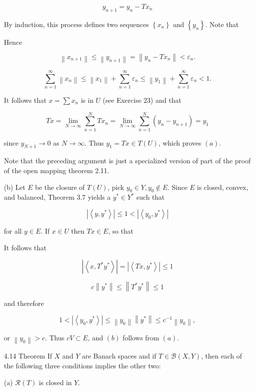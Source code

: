 \documentclass[10pt]{article}
\begin{document}
$$
y_{n+1}=y_{n}-T x_{n}
$$

By induction, this process defines two sequences $\left\{x_{n}\right\}$ and $\left\{y_{n}\right\}$. Note that

Hence

$$
\left\|x_{n+1}\right\| \leq\left\|y_{n+1}\right\|=\left\|y_{n}-T x_{n}\right\|<\varepsilon_{n} .
$$

$$
\sum_{n=1}^{\infty}\left\|x_{n}\right\| \leq\left\|x_{1}\right\|+\sum_{n=1}^{\infty} \varepsilon_{n} \leq\left\|y_{1}\right\|+\sum_{n=1}^{\infty} \varepsilon_{n}<1 .
$$

It follows that $x=\sum x_{n}$ is in $U$ (see Exercise 23) and that

$$
T x=\lim _{N \rightarrow \infty} \sum_{n=1}^{N} T x_{n}=\lim _{N \rightarrow \infty} \sum_{n=1}^{N}\left(y_{n}-y_{n+1}\right)=y_{1}
$$

since $y_{N+1} \rightarrow 0$ as $N \rightarrow \infty$. Thus $y_{1}=T x \in T(U)$, which proves $(a)$.

Note that the preceding argument is just a specialized version of part of the proof of the open mapping theorem 2.11.

(b) Let $E$ be the closure of $T(U)$, pick $y_{0} \in Y, y_{0} \notin E$. Since $E$ is closed, convex, and balanced, Theorem 3.7 yields a $y^{*} \in Y^{*}$ such that

$$
\left|\left\langle y, y^{*}\right\rangle\right| \leq 1<\left|\left\langle y_{0}, y^{*}\right\rangle\right|
$$

for all $y \in E$. If $x \in U$ then $T x \in E$, so that

It follows that

$$
\left|\left\langle x, T^{*} y^{*}\right\rangle\right|=\left|\left\langle T x, y^{*}\right\rangle\right| \leq 1
$$

$$
c\left\|y^{*}\right\| \leq\left\|T^{*} y^{*}\right\| \leq 1
$$

and therefore

$$
1<\left|\left\langle y_{0}, y^{*}\right\rangle\right| \leq\left\|y_{0}\right\|\left\|y^{*}\right\| \leq c^{-1}\left\|y_{0}\right\|,
$$

or $\left\|y_{0}\right\|>c$. Thus $c V \subset E$, and $(b)$ follows from $(a)$.

4.14 Theorem If $X$ and $Y$ are Banach spaces and if $T \in \mathscr{B}(X, Y)$, then each of the following three conditions implies the other two:

(a) $\mathscr{R}(T)$ is closed in $Y$.
\end{document}
